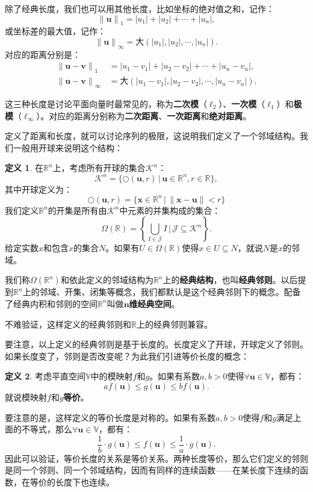 \documentclass[12pt,UTF8]{ctexbook}
\theoremstyle{definition}
\newtheorem{df}{定义}[section]
\theoremstyle{plain}
\begin{document}
除了经典长度，我们也可以用其他长度，比如坐标的绝对值之和，记作：
$$ \left\|\mathbf{u}\right\|_1 = |u_1| + |u_2| + \cdots + |u_n|,$$
或坐标差的最大值，记作：
$$ \left\| \mathbf{u} \right\|_{\infty} = \text{大}(|u_1|, |u_2|,\cdots, |u_n|). $$
对应的距离分别是：
\begin{align*}
    \left\|\mathbf{u} - \mathbf{v}\right\|_1\;\, &= |u_1 - v_1| + |u_2 - v_2| + \cdots + |u_n - v_n|,\\
    \left\| \mathbf{u} - \mathbf{v} \right\|_{\infty} &= \text{大}(|u_1 - v_1|, |u_2 - v_2|,\cdots, |u_n - v_n|).   
\end{align*}
 
这三种长度是讨论平面向量时最常见的，称为\textbf{二次模}（$\ell_2$）、\textbf{一次模}（$\ell_1$）和\textbf{极模}（$\ell_{\infty}$）。对应的距离分别称为\textbf{二次距离}、\textbf{一次距离}和\textbf{绝对距离}。

定义了距离和长度，就可以讨论序列的极限，这说明我们定义了一个邻域结构。我们一般用开球来说明这个结构：
\begin{df}
    在$\mathbb{R}^n$上，考虑所有开球的集合$\mathcal{K}^n$：
    $$ \mathcal{K}^n = \{ \bigcirc(\mathbf{u}, r) \, | \, \mathbf{u} \in \mathbb{R}^n, r \in \mathbb{R} \},$$
    其中开球定义为：
    $$ \bigcirc(\mathbf{u},r) = \{ \mathbf{x}\in \mathbb{R}^n\,|\, \| \mathbf{x} - \mathbf{u}\| < r\} $$
    我们定义$\mathbb{R}^n$的开集是所有由$\mathcal{K}^n$中元素的并集构成的集合：
    $$ \Omega(\mathbb{R}) = \left\{\bigcup_{I \in \mathcal{J}} I \, \Bigg| \,\mathcal{J} \subseteq  \mathcal{K}^n \right\}.$$
    给定实数$x$和包含$x$的集合$N$。如果有$U\in\Omega(\mathbb{R})$使得$x\in U\subseteq N$，就说$N$是$x$的邻域。

    我们称$\Omega(\mathbb{R}^n)$和依此定义的邻域结构为$\mathbb{R}^n$上的\textbf{经典结构}，也叫\textbf{经典邻则}。以后提到$\mathbb{R}^n$上的邻域、开集、闭集等概念，我们都默认是这个经典邻则下的概念。配备了经典内积和邻则的空间$\mathbb{R}^n$叫做$\boldsymbol{n}$\textbf{维经典空间}。
\end{df}

不难验证，这样定义的经典邻则和$\mathbb{R}$上的经典邻则兼容。

要注意，以上定义的经典邻则是基于长度的。长度定义了开球，开球定义了邻则。如果长度变了，邻则是否改变呢？为此我们引进等价长度的概念：
\begin{df}
    考虑平直空间$\mathbb{V}$中的模映射$f$和$g$。如果有系数$a,b>0$使得$\forall \mathbf{u} \in \mathbb{V}$，都有：
    $$ af(\mathbf{u}) \leqslant g(\mathbf{u}) \leqslant bf(\mathbf{u}).$$
    就说模映射$f$和$g$\textbf{等价}。
\end{df}
要注意的是，这样定义的等价长度是对称的。如果有系数$a,b>0$使得$f$和$g$满足上面的不等式，那么$\forall \mathbf{u} \in \mathbb{V}$，都有：
$$ \frac{1}{b}\cdot g(\mathbf{u}) \leqslant f(\mathbf{u}) \leqslant \frac{1}{a}\cdot g(\mathbf{u}). $$
因此可以验证，等价长度的关系是等价关系。两种长度等价，那么它们定义的邻则是同一个邻则、同一个邻域结构，因而有同样的连续函数——在某长度下连续的函数，在等价的长度下也连续。
\end{document}
